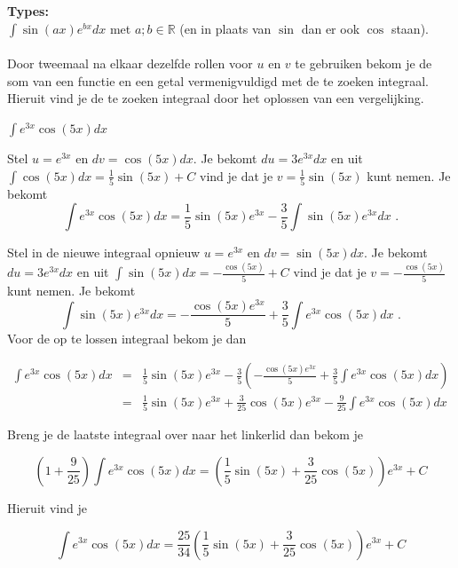 \begin{ftrekenregel}
	\textbf{Types:} \\

$\int \sin (ax)e^{bx}dx$ met $a; b \in \mathbb{R}$ (en in plaats van $\sin$ dan er ook $\cos$ staan).
\\
\\
Door tweemaal na elkaar dezelfde rollen voor $u$ en $v$ te gebruiken bekom je de som van een functie en een getal vermenigvuldigd met de te zoeken integraal.
Hieruit vind je de te zoeken integraal door het oplossen van een vergelijking.
\end{ftrekenregel}

\begin{voorbeeld}
	$\int e^{3x}\cos (5x)dx$

Stel $u=e^{3x}$ en $dv=\cos (5x)dx$.
Je bekomt $du=3e^{3x}dx$ en uit $\int \cos (5x)dx=\frac{1}{5} \sin (5x)+C$ vind je dat je $v=\frac{1}{5} \sin (5x)$ kunt nemen.
Je bekomt
\[
\int e^{3x}\cos (5x)dx=\frac{1}{5}\sin (5x)e^{3x}-\frac{3}{5}\int \sin (5x)e^{3x}dx \text { .}
\]

Stel in de nieuwe integraal opnieuw $u=e^{3x}$ en $dv=\sin (5x)dx$.
Je bekomt $du=3e^{3x}dx$ en uit $\int \sin (5x)dx=-\frac {\cos (5x)}{5}+C$ vind je dat je $v=-\frac {\cos (5x)}{5}$ kunt nemen.
Je bekomt
\[
\int \sin (5x)e^{3x}dx=-\frac {\cos (5x)e^{3x}}{5}+\frac{3}{5}\int e^{3x}\cos (5x)dx \text { .}
\]
Voor de op te lossen integraal bekom je dan

\begin{eqnarray*}
\int e^{3x}\cos (5x)dx&=&\frac{1}{5}\sin (5x)e^{3x}-\frac{3}{5} \left(  -\frac {\cos (5x)e^{3x}}{5}+\frac{3}{5}\int e^{3x}\cos (5x)dx  \right) \\
&=&\frac{1}{5}\sin (5x)e^{3x}+\frac{3}{25} \cos (5x)e^{3x}-\frac{9}{25}\int e^{3x}\cos (5x)dx 
\end{eqnarray*}


Breng je de laatste integraal over naar het linkerlid dan bekom je

\begin{equation*}
\left( 1+\frac{9}{25}  \right) \int e^{3x}\cos (5x)dx = \left(  \frac{1}{5}\sin (5x)+\frac{3}{25} \cos (5x)  \right)e^{3x}+C
\end{equation*}

Hieruit vind je

\begin{equation*}
\int e^{3x}\cos (5x)dx=\frac{25}{34} \left( \frac{1}{5}\sin (5x)+\frac{3}{25} \cos (5x)   \right)e^{3x}+C
\end{equation*}


\end{voorbeeld}

